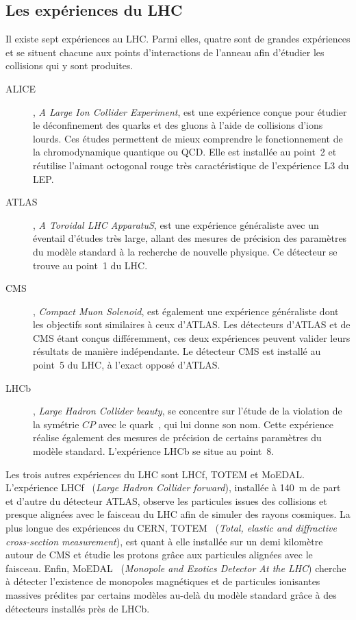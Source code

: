 \subsection{Les expériences du LHC}\label{chapter-LHC-section-LHC-subsec-experiments}
Il existe sept expériences au LHC.
Parmi elles, quatre sont de \og grandes expériences \fg{} et se situent chacune aux points d'interactions de l'anneau afin d'étudier les collisions qui y sont produites.
\begin{description}
\item[ALICE]\cite{alice_paper}, \emph{A Large Ion Collider Experiment}, est une expérience conçue pour étudier le déconfinement des quarks et des gluons à l'aide de collisions d'ions lourds. Ces études permettent de mieux comprendre le fonctionnement de la chromodynamique quantique ou QCD. Elle est installée au point~2 et réutilise l'aimant octogonal rouge très caractéristique de l'expérience L3 du LEP.
\item[ATLAS]\cite{atlas_paper}, \emph{A Toroidal LHC ApparatuS}, est une expérience généraliste avec un éventail d'études très large, allant des mesures de précision des paramètres du modèle standard à la recherche de nouvelle physique. Ce détecteur se trouve au point~1 du LHC.
\item[CMS]\cite{cms_paper}, \emph{Compact Muon Solenoid}, est également une expérience généraliste dont les objectifs sont similaires à ceux d'ATLAS. Les détecteurs d'ATLAS et de CMS étant conçus différemment, ces deux expériences peuvent valider leurs résultats de manière indépendante. Le détecteur CMS est installé au point~5 du LHC, à l'exact opposé d'ATLAS.
\item[LHCb]\cite{lhcb_paper}, \emph{Large Hadron Collider beauty}, se concentre sur l'étude de la violation de la symétrie $CP$ avec le quark~\quarkb, qui lui donne son nom. Cette expérience réalise également des mesures de précision de certains paramètres du modèle standard. L'expérience LHCb se situe au point~8.
\end{description}
\par Les trois autres expériences du LHC sont LHCf, TOTEM et MoEDAL.
L'expérience LHCf~\cite{lhcf_paper} (\emph{Large Hadron Collider forward}), installée à \SI{140}{\meter} de part et d'autre du détecteur ATLAS, observe les particules issues des collisions et presque alignées avec le faisceau du LHC afin de simuler des rayons cosmiques.
La plus \og longue \fg{} des expériences du CERN, TOTEM~\cite{totem_paper} (\emph{Total, elastic and diffractive cross-section measurement}), est quant à elle installée sur un demi kilomètre autour de CMS et étudie les protons grâce aux particules alignées avec le faisceau.
Enfin, MoEDAL~\cite{moedal_paper} (\emph{Monopole and Exotics Detector At the LHC}) cherche à détecter l'existence de monopoles magnétiques et de particules ionisantes massives prédites par certains modèles au-delà du modèle standard grâce à des détecteurs installés près de LHCb.